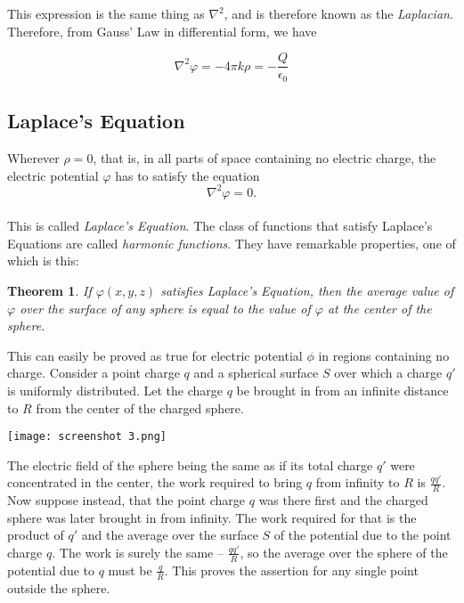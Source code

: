 \documentclass[svgnames]{article}
\newtheorem{theorem}{Theorem}		%
\begin{document}
This expression is the same thing as $\nabla^2$, and is therefore known as the \textit{Laplacian}. \\

Therefore, from Gauss' Law in differential form, we have 

\[ \nabla^2 \varphi = -4\pi k \rho = -\frac{Q}{\epsilon_0} \] 


\subsection{Laplace's Equation}

Wherever $\rho = 0 $, that is, in all parts of space containing no electric
charge, the electric potential  $\varphi$ has to satisfy the equation \[
\nabla^2 \varphi = 0
.\] \\

This is called \textit{Laplace's Equation}. The class of functions that satisfy
Laplace's Equations are called \textit{harmonic functions}. They have
remarkable properties, one of which is this: 

\begin{theorem}
  If $\varphi(x,y,z)$ satisfies Laplace's Equation, then the average value of
  $\varphi$ over the surface of any sphere is equal to the value of $\varphi$
  at the center of the sphere.
\end{theorem}

This can easily be proved as true for electric potential $\phi$ in regions
containing no charge. Consider a point charge $q$ and a spherical surface $S$
over which a charge $q'$ is uniformly distributed. Let the charge $q$ be
brought in from an infinite distance to  $R$ from the center of the charged
sphere. 

\begin{center}
\texttt{[image: screenshot 3.png]}
\end{center}

The electric field of the sphere being the same as if its total charge $q'$
were concentrated in the center, the work required to bring $q$ from infinity
to $R$ is $\frac{qq'}{R}$. Now suppose instead, that the point charge $q$ was
there first and the charged sphere was later brought in from infinity. The work
required for that is the product of $q'$ and the average over the surface $S$
of the potential due to the point charge $q$. The work is surely the same --
$\frac{qq'}{R}$, so the average over the sphere of the potential due to $q$
must be $\frac{q}{R}$. This proves the assertion for any single point outside
the sphere. 
\end{document}
